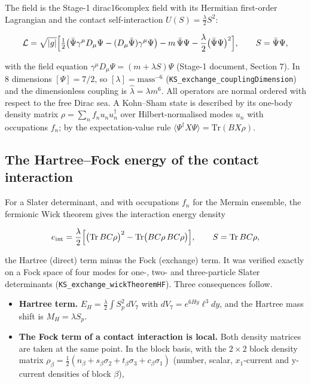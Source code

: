 \documentclass[11pt]{article}
\begin{document}
The field is the Stage-1 dirac16complex field with its Hermitian first-order Lagrangian and the contact self-interaction $U(S)=\tfrac\lambda2S^2$:

\[
\mathcal L=\sqrt{|g|}\Bigl[\tfrac12\bigl(\bar\Psi\gamma^\mu D_\mu\Psi-(D_\mu\bar\Psi)\gamma^\mu\Psi\bigr)-m\,\bar\Psi\Psi-\frac\lambda2\bigl(\bar\Psi\Psi\bigr)^2\Bigr],\qquad S=\bar\Psi\Psi ,
\]

with the field equation $\gamma^\mu D_\mu\Psi=(m+\lambda S)\Psi$ (Stage-1 document, Section 7). In 8 dimensions $[\Psi]=7/2$, so $[\lambda]=\mathrm{mass}^{-6}$ (\texttt{KS\_excha\allowbreak{}nge\_coup\allowbreak{}lingDime\allowbreak{}nsion}) and the dimensionless coupling is $\hat\lambda=\lambda m^6$. All operators are normal ordered with respect to the free Dirac sea. A Kohn--Sham state is described by its one-body density matrix $\rho=\sum_nf_nu_nu_n^\dagger$ over Hilbert-normalised modes $u_n$ with occupations $f_n$; by the expectation-value rule $\langle\Psi^\dagger X\Psi\rangle=\mathrm{Tr}(BX\rho)$.

\subsection{The Hartree--Fock energy of the contact interaction}

For a Slater determinant, and with occupations $f_n$ for the Mermin ensemble, the fermionic Wick theorem gives the interaction energy density

\[
e_{\mathrm{int}}=\frac\lambda2\Bigl[\bigl(\mathrm{Tr}\,BC\rho\bigr)^2-\mathrm{Tr}\bigl(BC\rho\,BC\rho\bigr)\Bigr],\qquad S=\mathrm{Tr}\,BC\rho ,
\]

the Hartree (direct) term minus the Fock (exchange) term. It was verified exactly on a Fock space of four modes for one-, two- and three-particle Slater determinants (\texttt{KS\_excha\allowbreak{}nge\_wick\allowbreak{}TheoremH\allowbreak{}F}). Three consequences follow.

\begin{itemize}
\item \textbf{Hartree term.} $E_H=\tfrac\lambda2\int S_p^2\,dV_7$ with $dV_7=e^{6Hy}\ell^3dy$, and the Hartree mass shift is $M_H=\lambda S_p$.
\item \textbf{The Fock term of a contact interaction is local.} Both density matrices are taken at the same point. In the block basis, with the $2\times2$ block density matrix $\rho_\beta=\tfrac12(n_\beta+s_\beta\sigma_2+t_\beta\sigma_3+c_\beta\sigma_1)$ (number, scalar, $x_1$-current and y-current densities of block $\beta$),
\end{itemize}
\end{document}
